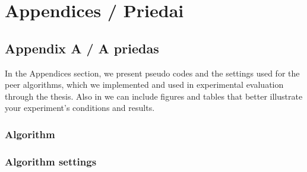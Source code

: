 
\renewcommand{\thesection}{\alph{section}}


\renewcommand*{\thesection}{A}
\renewcommand{\thefigure}{A.\arabic{figure}}   
\setcounter{figure}{0}
\renewcommand{\thetable}{A.\arabic{table}}
\setcounter{table}{0}


\chapter*{Appendices / Priedai} %
\label{cha:appendices}

\section*{Appendix A / A priedas}
\label{cha:appendixA}




In the Appendices section, we present pseudo codes and the settings used for the peer algorithms, which we implemented and used in experimental evaluation through the thesis. Also in we can include figures and tables that better illustrate your experiment's conditions and results.


\subsection{Algorithm}

\subsection*{Algorithm settings}

